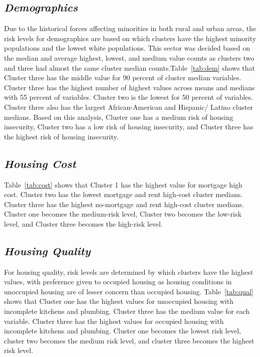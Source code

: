 



\subsection{\textit{Demographics}}
Due to the historical forces affecting minorities in both rural and urban areas, the risk levels for demographics are based on which clusters have the highest minority populations and the lowest white populations. This sector was decided based on the median and average highest, lowest, and medium value counts as clusters two and three had almost the same cluster median counts.Table~\ref{tab:dem} shows that Cluster three has the middle value for 90 percent of cluster median variables. Cluster three has the highest number of highest values across means and medians with 55 percent of variables. Cluster two is the lowest for 50 percent of variables. Cluster three also has the largest African-American and Hispanic/ Latino cluster medians. Based on this analysis, Cluster one has a medium risk of housing insecurity, Cluster two has a low risk of housing insecurity, and Cluster three has the highest risk of housing insecurity. 




\subsection{\textit{Housing Cost}}

Table~\ref{tab:cost} shows that Cluster 1 has the highest value for mortgage high cost. Cluster two has the lowest mortgage and rent high-cost cluster medians. Cluster three has the highest no-mortgage and rent high-cost cluster medians. Cluster one becomes the medium-risk level, Cluster two becomes the low-risk level, and Cluster three becomes the high-risk level. 



\subsection{\textit{Housing Quality}}
For housing quality, risk levels are determined by which clusters have the highest values, with preference given to occupied housing as housing conditions in unoccupied housing are of lesser concern than occupied housing. Table~\ref{tab:qual} shows that Cluster one has the highest values for unoccupied housing with incomplete kitchens and plumbing. Cluster three has the medium value for each variable. Cluster three has the highest values for occupied housing with incomplete kitchens and plumbing. Cluster one becomes the lowest risk level, cluster two becomes the medium risk level, and cluster three becomes the highest risk level. 

